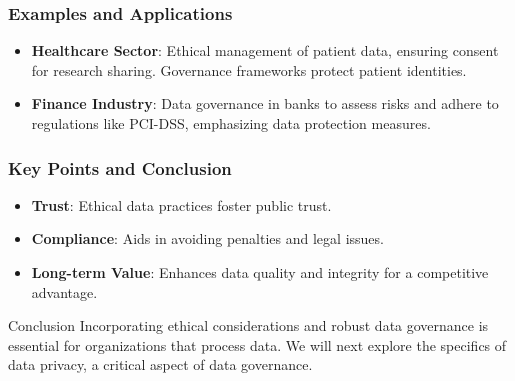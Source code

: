 \documentclass[aspectratio=169]{beamer}
\begin{document}
\begin{frame}[fragile]
    \frametitle{Examples and Applications}
    \begin{itemize}
        \item \textbf{Healthcare Sector}: Ethical management of patient data, ensuring consent for research sharing. Governance frameworks protect patient identities.
        \item \textbf{Finance Industry}: Data governance in banks to assess risks and adhere to regulations like PCI-DSS, emphasizing data protection measures.
    \end{itemize}
\end{frame}

\begin{frame}[fragile]
    \frametitle{Key Points and Conclusion}
    \begin{itemize}
        \item \textbf{Trust}: Ethical data practices foster public trust.
        \item \textbf{Compliance}: Aids in avoiding penalties and legal issues.
        \item \textbf{Long-term Value}: Enhances data quality and integrity for a competitive advantage.
    \end{itemize}
    \begin{block}{Conclusion}
        Incorporating ethical considerations and robust data governance is essential for organizations that process data. We will next explore the specifics of data privacy, a critical aspect of data governance.
    \end{block}
\end{frame}
\end{document}
